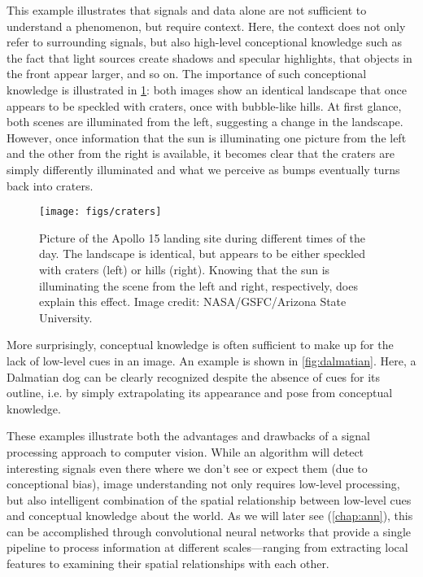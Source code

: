 This example illustrates that signals and data alone are not sufficient to understand a phenomenon, but require context. Here, the context does not only refer to surrounding signals, but also high-level conceptional knowledge such as the fact that light sources create shadows and specular highlights, that objects in the front appear larger, and so on. The importance of such conceptional knowledge is illustrated in \cref{fig:craters}:
both images show an identical landscape that once appears to be speckled with craters, once with bubble-like hills. At first glance, both scenes are illuminated from the left, suggesting a change in the landscape. However, once information that the sun is illuminating one picture from the left and the other from the right is available, it becomes clear that the craters are simply differently illuminated and what we perceive as bumps eventually turns back into craters.

\begin{figure}[!htb]
    \centering
    \texttt{[image: figs/craters]}
    \caption{Picture of the Apollo 15 landing site during different times of the day. The landscape is identical, but appears to be either speckled with craters (left) or hills (right). Knowing that the sun is illuminating the scene from the left and right, respectively, does explain this effect. Image credit: NASA/GSFC/Arizona State University.
    \label{fig:craters}}
\end{figure}

More surprisingly, conceptual knowledge is often sufficient to make up for the lack of low-level cues in an image. An example is shown in \cref{fig:dalmatian}. Here, a Dalmatian dog can be clearly recognized despite the absence of cues for its outline, i.e. by simply extrapolating its appearance and pose from conceptual knowledge.

These examples illustrate both the advantages and drawbacks of a signal processing approach to computer vision. While an algorithm will detect interesting signals even there where we don't see or expect them (due to conceptional bias), image understanding not only requires low-level processing, but also intelligent combination of the spatial relationship between low-level cues and conceptual knowledge about the world. As we will later see (\cref{chap:ann}), this can be accomplished through convolutional neural networks that provide a single pipeline to process information at different scales---ranging from extracting local features to examining their spatial relationships with each other.

